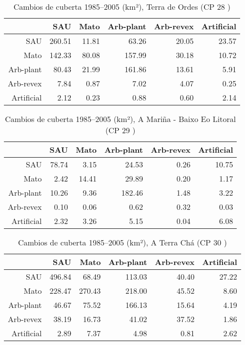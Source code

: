 \begin{table}[p]
\centering
\caption{Cambios de cuberta 1985--2005 (km²), Terra de Ordes (CP 28 )} 
\label{TaboaContinxCP28}
\begin{tabular}{rrrrrr}
  \hline
 & SAU & Mato & Arb-plant & Arb-revex & Artificial \\ 
  \hline
SAU & 260.51 & 11.81 & 63.26 & 20.05 & 23.57 \\ 
  Mato & 142.33 & 80.08 & 157.99 & 30.18 & 10.72 \\ 
  Arb-plant & 80.43 & 21.99 & 161.86 & 13.61 & 5.91 \\ 
  Arb-revex & 7.84 & 0.87 & 7.02 & 4.07 & 0.25 \\ 
  Artificial & 2.12 & 0.23 & 0.88 & 0.60 & 2.14 \\ 
   \hline
\end{tabular}
\end{table}
\begin{table}[p]
\centering
\caption{Cambios de cuberta 1985--2005 (km²), A Mariña - Baixo Eo Litoral (CP 29 )} 
\label{TaboaContinxCP29}
\begin{tabular}{rrrrrr}
  \hline
 & SAU & Mato & Arb-plant & Arb-revex & Artificial \\ 
  \hline
SAU & 78.74 & 3.15 & 24.53 & 0.26 & 10.75 \\ 
  Mato & 2.42 & 14.41 & 29.89 & 0.20 & 1.17 \\ 
  Arb-plant & 10.26 & 9.36 & 182.46 & 1.48 & 3.22 \\ 
  Arb-revex & 0.10 & 0.06 & 0.62 & 0.32 & 0.03 \\ 
  Artificial & 2.32 & 3.26 & 5.15 & 0.04 & 6.08 \\ 
   \hline
\end{tabular}
\end{table}
\begin{table}[p]
\centering
\caption{Cambios de cuberta 1985--2005 (km²), A Terra Chá (CP 30 )} 
\label{TaboaContinxCP30}
\begin{tabular}{rrrrrr}
  \hline
 & SAU & Mato & Arb-plant & Arb-revex & Artificial \\ 
  \hline
SAU & 496.84 & 68.49 & 113.03 & 40.40 & 27.22 \\ 
  Mato & 228.47 & 270.43 & 218.00 & 45.52 & 8.60 \\ 
  Arb-plant & 46.67 & 75.52 & 166.13 & 15.64 & 4.19 \\ 
  Arb-revex & 38.19 & 16.73 & 41.02 & 37.52 & 1.86 \\ 
  Artificial & 2.89 & 7.37 & 4.98 & 0.81 & 2.62 \\ 
   \hline
\end{tabular}
\end{table}
